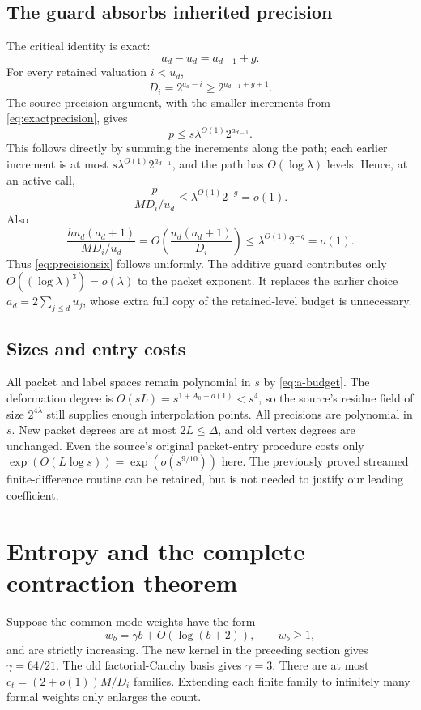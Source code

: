 \documentclass[11pt,letterpaper]{article}
\theoremstyle{definition}\newtheorem{definition}[theorem]{Definition}
\theoremstyle{remark}\newtheorem{remark}[theorem]{Remark}
\begin{document}
\subsection{The guard absorbs inherited precision}
The critical identity is exact:
\[
 a_d-u_d=a_{d-1}+g.
\]
For every retained valuation $i<u_d$,
\begin{equation}\label{eq:Dlower}
 D_i=2^{a_d-i}\ge2^{a_{d-1}+g+1}.
\end{equation}
The source precision argument, with the smaller increments from
\eqref{eq:exactprecision}, gives
\[
 p\le s\lambda^{O(1)}2^{a_{d-1}}.
\]
This follows directly by summing the increments along the path; each
earlier increment is at most $s\lambda^{O(1)}2^{a_{d-1}}$, and the
path has $O(\log\lambda)$ levels. Hence, at an active call,
\[
 \frac{p}{MD_i/u_d}\le\lambda^{O(1)}2^{-g}=o(1).
\]
Also
\[
 \frac{hu_d(a_d+1)}{MD_i/u_d}
 =O\!\left(\frac{u_d(a_d+1)}{D_i}\right)
 \le\lambda^{O(1)}2^{-g}=o(1).
\]
Thus \eqref{eq:precisionsix} follows uniformly. The additive guard
contributes only $O((\log\lambda)^3)=o(\lambda)$ to the packet
exponent. It replaces the earlier choice $a_d=2\sum_{j\le d}u_j$,
whose extra full copy of the retained-level budget is unnecessary.

\subsection{Sizes and entry costs}
All packet and label spaces remain polynomial in $s$ by
\eqref{eq:a-budget}. The deformation degree is
$O(sL)=s^{1+A_0+o(1)}<s^4$, so the source's residue field of
size $2^{4\lambda}$ still supplies enough interpolation points.
All precisions are polynomial in $s$. New packet degrees are at most
$2L\le\Delta$, and old vertex degrees are unchanged. Even the source's
original packet-entry procedure costs only
$\exp(O(L\log s))=\exp(o(s^{9/10}))$ here. The previously proved
streamed finite-difference routine can be retained, but is not needed to
justify our leading coefficient.



\section{Entropy and the complete contraction theorem}\label{sec:global}
Suppose the common mode weights have the form
\[
 w_b=\gamma b+O(\log(b+2)),\qquad w_b\ge1,
\]
and are strictly increasing. The new kernel in the preceding section
gives $\gamma=64/21$. The old factorial-Cauchy basis gives $\gamma=3$.
There are at most $c_t=(2+o(1))M/D_i$ families. Extending each finite
family to infinitely many formal weights only enlarges the count.
\end{document}
